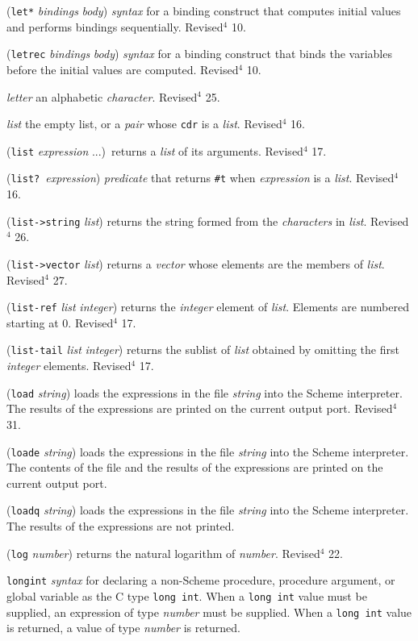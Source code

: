 \documentclass[10pt,twocolumn]{article}
\begin{document}
(\texttt{let*} \emph{bindings} \emph{body}) \emph{syntax} for a binding construct
that computes initial values and performs bindings sequentially.
Revised$^4$ 10.

(\texttt{letrec} \emph{bindings} \emph{body}) \emph{syntax} for a binding construct
that binds the variables before the initial values are computed.
Revised$^4$ 10.

\emph{letter} an alphabetic \emph{character}.  Revised$^4$ 25.

\emph{list} the empty list, or a \emph{pair} whose \texttt{cdr} is a \emph{list}.
Revised$^4$ 16.

(\texttt{list} \emph{expression} ...)\ returns a \emph{list} of its arguments.
Revised$^4$ 17.

(\texttt{list?}\ \emph{expression}) \emph{predicate} that returns \texttt{\#t}
when \emph{expression} is a \emph{list}.  Revised$^4$ 16.

(\texttt{list->string} \emph{list}) returns the string formed from the
\emph{characters} in \emph{list}.  Revised$^4$ 26.

(\texttt{list->vector} \emph{list}) returns a \emph{vector} whose elements are the
members of \emph{list}.  Revised$^4$ 27.

(\texttt{list-ref} \emph{list} \emph{integer}) returns the \emph{integer} element
of \emph{list}.  Elements are numbered starting at 0.  Revised$^4$ 17.

(\texttt{list-tail} \emph{list} \emph{integer}) returns the sublist of \emph{list}
obtained by omitting the first \emph{integer} elements.  Revised$^4$ 17.

(\texttt{load} \emph{string}) loads the expressions in the file \emph{string}
into the Scheme interpreter.  The results of the expressions are
printed on the current output port.  Revised$^4$ 31.

(\texttt{loade} \emph{string}) loads the expressions in the file
\emph{string} into the Scheme interpreter.  The contents of the
file and the results of the expressions are printed on the
current output port.

(\texttt{loadq} \emph{string}) loads the expressions in the file \emph{string}
into the Scheme interpreter.  The results of the expressions are not
printed.

(\texttt{log} \emph{number}) returns the natural logarithm of \emph{number}.
Revised$^4$ 22.

\texttt{longint} \emph{syntax} for declaring a non-Scheme procedure,
procedure argument, or global variable as the C type \texttt{long int}.
When a \texttt{long int} value must be supplied, an expression of type
\emph{number} must be supplied.  When a \texttt{long int} value is returned,
a value of type \emph{number} is returned.
\end{document}
